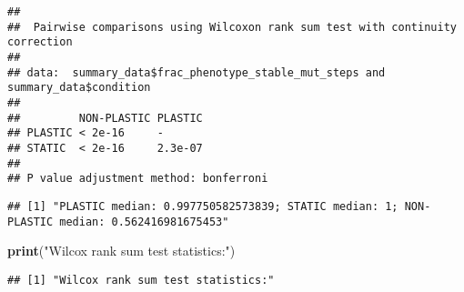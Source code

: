 \documentclass[]{book}
\newenvironment{Shaded}{\begin{snugshade}}{\end{snugshade}}
\newcommand{\DataTypeTok}[1]{\textcolor[rgb]{0.13,0.29,0.53}{#1}}
\newcommand{\KeywordTok}[1]{\textcolor[rgb]{0.13,0.29,0.53}{\textbf{#1}}}
\newcommand{\NormalTok}[1]{#1}
\newcommand{\OperatorTok}[1]{\textcolor[rgb]{0.81,0.36,0.00}{\textbf{#1}}}
\newcommand{\StringTok}[1]{\textcolor[rgb]{0.31,0.60,0.02}{#1}}
\begin{document}
\begin{verbatim}
## 
##  Pairwise comparisons using Wilcoxon rank sum test with continuity correction 
## 
## data:  summary_data$frac_phenotype_stable_mut_steps and summary_data$condition 
## 
##         NON-PLASTIC PLASTIC
## PLASTIC < 2e-16     -      
## STATIC  < 2e-16     2.3e-07
## 
## P value adjustment method: bonferroni
\end{verbatim}

\begin{Shaded}
\end{Shaded}

\begin{verbatim}
## [1] "PLASTIC median: 0.997750582573839; STATIC median: 1; NON-PLASTIC median: 0.562416981675453"
\end{verbatim}

\begin{Shaded}
\begin{Highlighting}[]
\KeywordTok{print}\NormalTok{(}\StringTok{"Wilcox rank sum test statistics:"}\NormalTok{)}
\end{Highlighting}
\end{Shaded}

\begin{verbatim}
## [1] "Wilcox rank sum test statistics:"
\end{verbatim}
\end{document}
